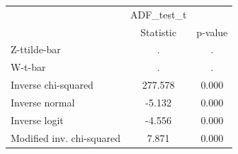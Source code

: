 \begin{tabular}{l*{2}{c}}
\hline\hline
            &  ADF\_test\_t&            \\
            &   Statistic&     p-value\\
\hline
Z-ttilde-bar&           .&           .\\
W-t-bar     &           .&           .\\
Inverse chi-squared&     277.578&       0.000\\
Inverse normal&      -5.132&       0.000\\
Inverse logit&      -4.556&       0.000\\
Modified inv. chi-squared&       7.871&       0.000\\
\hline\hline
\end{tabular}
